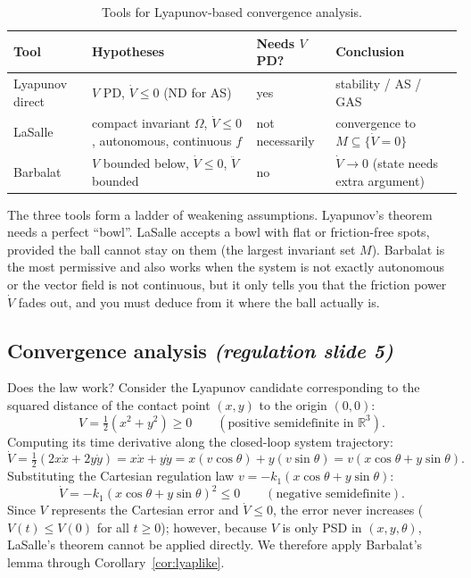 \documentclass[11pt,a4paper]{article}
\def\bm#1{#1}%
\newcommand{\R}{\mathbb{R}}
\theoremstyle{definition}
\theoremstyle{plain}
\theoremstyle{remark}
\begin{document}
\begin{table}[ht]
\centering
\renewcommand{\arraystretch}{1.3}
\begin{tabular}{@{}>{\raggedright\arraybackslash}p{2.6cm}>{\raggedright\arraybackslash}p{4.3cm}>{\raggedright\arraybackslash}p{3.0cm}>{\raggedright\arraybackslash}p{4.3cm}@{}}
\toprule
\textbf{Tool} & \textbf{Hypotheses} & \textbf{Needs $V$ PD?} & \textbf{Conclusion}\\
\midrule
Lyapunov direct & $V$ PD, $\dot V\le0$ (ND for AS) & yes & stability / AS / GAS\\
LaSalle & compact invariant $\Omega$, $\dot V\le0$, autonomous, continuous $\bm f$ & not necessarily & convergence to $M\subseteq\{\dot V=0\}$\\
Barbalat & $V$ bounded below, $\dot V\le0$, $\ddot V$ bounded & no & $\dot V\to0$ (state needs extra argument)\\
\bottomrule
\end{tabular}
\caption{Tools for Lyapunov-based convergence analysis.}
\end{table}

\begin{intuition}
The three tools form a ladder of weakening assumptions. Lyapunov's theorem needs a perfect ``bowl''. LaSalle accepts a bowl with flat or friction-free spots, provided the ball cannot stay on them (the largest invariant set $M$). Barbalat is the most permissive and also works when the system is not exactly autonomous or the vector field is not continuous, but it only tells you that the friction power $\dot V$ fades out, and you must deduce from it where the ball actually is.
\end{intuition}

\subsection{Convergence analysis \emph{(regulation slide 5)}}

Does the law work? Consider the Lyapunov candidate corresponding to the squared distance of the contact point $(x,y)$ to the origin $(0,0)$:
\[
V=\tfrac12(x^2+y^2)\ge0\qquad (\text{positive semidefinite in }\R^3).
\]
Computing its time derivative along the closed-loop system trajectory:
\[
\dot V = \tfrac12(2x\dot x + 2y\dot y) = x\dot x + y\dot y = x(v\cos\theta) + y(v\sin\theta) = v(x\cos\theta + y\sin\theta).
\]
Substituting the Cartesian regulation law $v = -k_1(x\cos\theta + y\sin\theta)$:
\[
\dot V = -k_1(x\cos\theta + y\sin\theta)^2 \le 0\qquad (\text{negative semidefinite}).
\]
Since $V$ represents the Cartesian error and $\dot V\le0$, the error never increases ($V(t)\le V(0)$ for all $t\ge0$); however, because $V$ is only PSD in $(x,y,\theta)$, LaSalle's theorem cannot be applied directly. We therefore apply Barbalat's lemma through Corollary~\ref{cor:lyaplike}.
\end{document}
